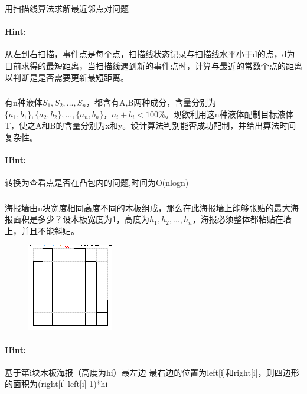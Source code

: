 \documentclass{article}
\begin{document}
      \subsubsection{}用扫描线算法求解最近邻点对问题
     \paragraph{Hint:}从左到右扫描，事件点是每个点，扫描线状态记录与扫描线水平小于d的点，d为目前求得的最短距离，当扫描线遇到新的事件点时，计算与最近的常数个点的距离以判断是是否需要更新最短距离。
     
     \subsubsection{}有n种液体$S_1,S_2,…,S_n$，都含有A,B两种成分，含量分别为$\{ a_1,b_1 \},\{a_2,b_2 \},…,\{ a_n,b_n \}，a_i+b_i<100 \% $。现欲利用这n种液体配制目标液体T，使之A和B的含量分别为x和y。设计算法判别能否成功配制，并给出算法时间复杂性。
     \paragraph{Hint:}转换为查看点是否在凸包内的问题,时间为O(nlogn)
     
         
     \subsubsection{}海报墙由n块宽度相同高度不同的木板组成，那么在此海报墙上能够张贴的最大海报面积是多少？设木板宽度为1，高度为$h_1,h_2,…,h_n$，海报必须整体都粘贴在墙上，并且不能斜贴。  
     \begin{figure}[h]
 	\centering
 	\includegraphics[scale=0.6]{poster.png}
    \end{figure}
    
     \paragraph{Hint:}基于第i块木板海报（高度为hi）最左边 最右边的位置为left[i]和right[i]，则四边形的面积为(right[i]-left[i]-1)*hi\\
     
\end{document}
